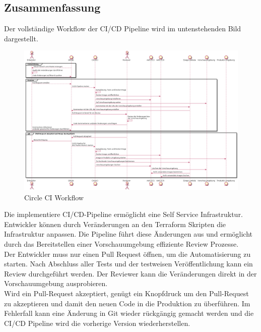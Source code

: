 \newpage
\subsection{Zusammenfassung}\label{implementierung_zusammenfassung}

Der vollständige Workflow der CI/CD Pipeline wird im untenstehenden Bild dargestellt.

\begin{figure}[htb]
    \centering
    \includegraphics[width=1.0\textwidth]{images/workflow.png}
    \caption[Circle CI Workflow]{Circle CI Workflow}
    \label{fig:circle_ci_workflow}
\end{figure}

Die implementiere CI/CD-Pipeline ermöglicht eine Self Service Infrastruktur.
Entwickler können durch Veränderungen an den Terraform Skripten die Infrastruktur anpassen.
Die Pipeline führt diese Änderungen aus und ermöglicht durch das Bereitstellen einer Vorschauumgebung effiziente Review Prozesse. \\

Der Entwickler muss nur einen Pull Request öffnen, um die Automatisierung zu starten.
Nach Abschluss aller Tests und der testweisen Veröffentlichung kann ein Review durchgeführt werden.
Der Reviewer kann die Veränderungen direkt in der Vorschauumgebung ausprobieren. \\

Wird ein Pull-Request akzeptiert, genügt ein Knopfdruck um den Pull-Request zu akzeptieren und damit den neuen Code in die Produktion zu überführen.
Im Fehlerfall kann eine Änderung in Git wieder rückgängig gemacht werden und die CI/CD Pipeline wird die vorherige Version wiederherstellen.

